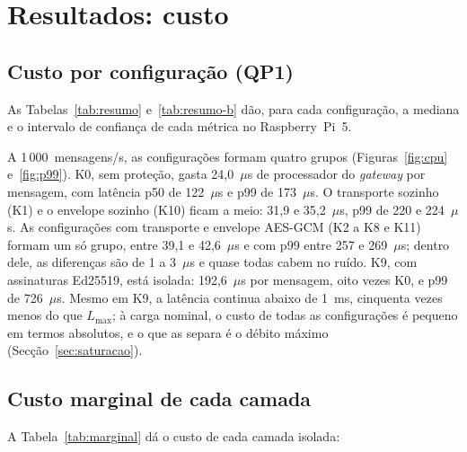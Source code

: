 \section{Resultados: custo}
\label{sec:custo}

\subsection{Custo por configuração (QP1)}

As Tabelas~\ref{tab:resumo} e~\ref{tab:resumo-b} dão, para cada configuração, a
mediana e o intervalo de confiança de cada métrica no Raspberry~Pi~5.



A 1\,000~mensagens/s, as configurações formam quatro grupos
(Figuras~\ref{fig:cpu} e~\ref{fig:p99}). K0, sem proteção, gasta
24,0~$\mu$s de processador do \emph{gateway} por mensagem, com latência p50 de
122~$\mu$s e p99 de 173~$\mu$s. O transporte sozinho (K1) e o envelope sozinho
(K10) ficam a meio: 31,9 e 35,2~$\mu$s, p99 de 220 e 224~$\mu$s. As
configurações com transporte e envelope AES-GCM (K2 a K8 e K11) formam um só
grupo, entre 39,1 e 42,6~$\mu$s e com p99 entre 257 e 269~$\mu$s; dentro dele,
as diferenças são de 1 a 3~$\mu$s e quase todas cabem no ruído. K9, com
assinaturas Ed25519, está isolada: 192,6~$\mu$s por mensagem, oito vezes K0, e p99
de 726~$\mu$s. Mesmo em K9, a latência continua abaixo de 1~ms, cinquenta vezes
menos do que $L_{\max}$; à carga nominal, o custo de todas as configurações é
pequeno em termos absolutos, e o que as separa é o débito máximo
(Secção~\ref{sec:saturacao}).

\subsection{Custo marginal de cada camada}


A Tabela~\ref{tab:marginal} dá o custo de cada camada isolada:

